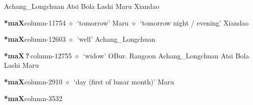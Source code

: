 \hspace{1ex}
         Achang\_Longchuan 
\hspace{1ex}
         Atsi 
\hspace{1ex}
         Bola 
\hspace{1ex}
         Lashi 
\hspace{1ex}
         Maru 
\hspace{1ex}
         Xiandao 
  \item {\footnotesize \textbf{*maX}}{\tiny column-11754}
         $\diamond$~`tomorrow'
         Maru 
\hspace{1ex}
         $\diamond$~`tomorrow night / evening'
         Xiandao 
  \item {\footnotesize \textbf{*maX}}{\tiny column-12603}
         $\diamond$~`well'
         Achang\_Longchuan 
  \item {\footnotesize \textbf{*maX\,?\,}}{\tiny column-12755}
         $\diamond$~`widow'
         OBur. 
\hspace{1ex}
         Rangoon 
\hspace{1ex}
         Achang\_Longchuan 
\hspace{1ex}
         Atsi 
\hspace{1ex}
         Bola 
\hspace{1ex}
         Lashi 
\hspace{1ex}
         Maru 
  \item {\footnotesize \textbf{*maX}}{\tiny column-2910}
         $\diamond$~`day (first of lunar month)'
         Maru 
  \item {\footnotesize \textbf{*maX}}{\tiny column-3532}
